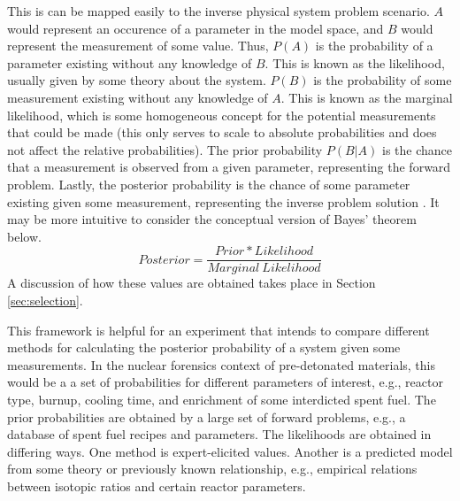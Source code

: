 This is can be mapped easily to the inverse physical system problem scenario.
$A$ would represent an occurence of a parameter in the model space, and $B$
would represent the measurement of some value. Thus, $P(A)$ is the probability
of a parameter existing without any knowledge of $B$. This is known as the
likelihood, usually given by some theory about the system. $P(B)$ is the
probability of some measurement existing without any knowledge of $A$. This is
known as the marginal likelihood, which is some homogeneous concept for the
potential measurements that could be made (this only serves to scale to
absolute probabilities and does not affect the relative probabilities). The
prior probability $P(B|A)$ is the chance that a measurement is observed from a
given parameter, representing the forward problem.  Lastly, the posterior
probability is the chance of some parameter existing given some measurement,
representing the inverse problem solution \cite{inverse_theory}.  It may be
more intuitive to consider the conceptual version of Bayes' theorem below.  
\begin{equation}
Posterior = \frac{Prior * Likelihood}{Marginal \ Likelihood} 
\end{equation} 
A discussion of how these values are obtained takes place in Section
\ref{sec:selection}.

This framework is helpful for an experiment that intends to compare different
methods for calculating the posterior probability of a system given some
measurements.  In the nuclear forensics context of pre-detonated materials,
this would be a a set of probabilities for different parameters of interest,
e.g., reactor type, burnup, cooling time, and enrichment of some interdicted
spent fuel. The prior probabilities are obtained by a large set of forward
problems, e.g., a database of spent fuel recipes and parameters. The
likelihoods are obtained in differing ways. One method is expert-elicited
values. Another is a predicted model from some theory or previously known
relationship, e.g., empirical relations between isotopic ratios and certain
reactor parameters. 
